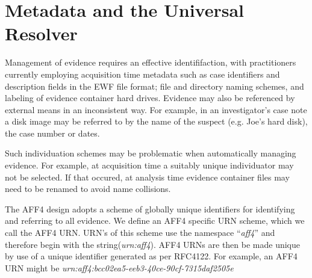 \documentclass[10pt, conference]{IEEEtran}
\begin{document}
\section{Metadata and the Universal Resolver}
\label{resolver}

Management of evidence requires an effective identififaction, with
practitioners currently employing acquisition time metadata such as
case identifiers and description fields in the EWF file format; file
and directory naming schemes, and labeling of evidence container hard
drives. Evidence may also be referenced by external means in an
inconsistent way. For example, in an investigator's case note a disk
image may be referred to by the name of the suspect (e.g. Joe's hard
disk), the case number or dates.

Such individuation schemes may be problematic when automatically
managing evidence. For example, at acquisition time a suitably unique
individuator may not be selected. If that occured, at analysis time
evidence container files may need to be renamed to avoid name
collisions.

The AFF4 design adopts a scheme of globally unique identifiers for
identifying and referring to all evidence. We define an AFF4 specific
URN scheme, which we call the AFF4 URN. URN's of this scheme use the
namespace\cite{RFC1737} ``\emph{aff4}'' and therefore begin with the 
string(\emph{urn:aff4}). AFF4 URNs are then be made unique by use of 
a unique identifier generated
as per RFC4122\cite{RFC4122}. For example, an AFF4 URN might be
\emph{urn:aff4:bcc02ea5-eeb3-40ce-90cf-7315daf2505e}

\end{document}
